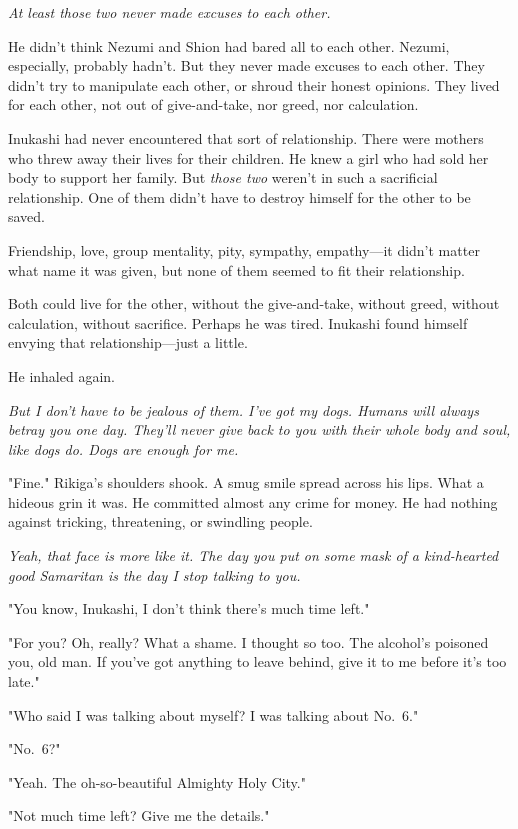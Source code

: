 \emph{At least those two never made excuses to each other.}

He didn't think Nezumi and Shion had bared all to each other. Nezumi,
especially, probably hadn't. But they never made excuses to each other.
They didn't try to manipulate each other, or shroud their honest
opinions. They lived for each other, not out of give-and-take, nor
greed, nor calculation.

Inukashi had never encountered that sort of relationship. There were
mothers who threw away their lives for their children. He knew a girl
who had sold her body to support her family. But \emph{those two} weren't in
such a sacrificial relationship. One of them didn't have to destroy
himself for the other to be saved.

Friendship, love, group mentality, pity, sympathy, empathy---it didn't
matter what name it was given, but none of them seemed to fit their
relationship.

Both could live for the other, without the give-and-take, without greed,
without calculation, without sacrifice. Perhaps he was tired. Inukashi
found himself envying that relationship---just a little.

He inhaled again.

\emph{But I don't have to be jealous of them. I've got my dogs. Humans will
always betray you one day. They'll never give back to you with their
whole body and soul, like dogs do. Dogs are enough for me.}

"Fine." Rikiga's shoulders shook. A smug smile spread across his lips.
What a hideous grin it was. He committed almost any crime for money. He
had nothing against tricking, threatening, or swindling people.

\emph{Yeah, that face is more like it. The day you put on some mask of a
kind-hearted good Samaritan is the day I stop talking to you.}

"You know, Inukashi, I don't think there's much time left."

"For you? Oh, really? What a shame. I thought so too. The alcohol's
poisoned you, old man. If you've got anything to leave behind, give it
to me before it's too late."

"Who said I was talking about myself? I was talking about No.~6."

"No.~6?"

"Yeah. The oh-so-beautiful Almighty Holy City."

"Not much time left? Give me the details."

